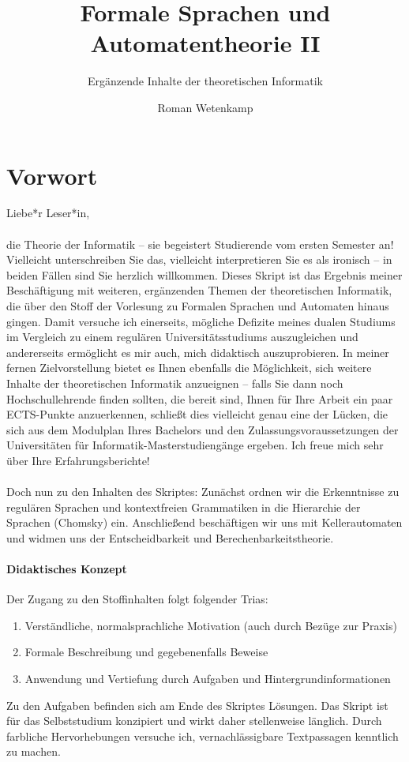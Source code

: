 \documentclass[11pt,a4paper]{scrreport}
\title{Formale Sprachen und Automatentheorie II}
\subtitle{Ergänzende Inhalte der theoretischen Informatik}
\author{Roman Wetenkamp}
\theoremstyle{remark}
\theoremstyle{definition}
\begin{document}
\maketitle

\pagebreak
\tableofcontents
\pagebreak
\section*{Vorwort}
Liebe*r Leser*in,\\\\
die Theorie der Informatik -- sie begeistert Studierende vom ersten Semester an! Vielleicht unterschreiben Sie das, vielleicht interpretieren Sie es als ironisch -- in beiden Fällen sind Sie herzlich willkommen. Dieses Skript ist das Ergebnis meiner Beschäftigung mit weiteren, ergänzenden Themen der theoretischen Informatik, die über den Stoff der Vorlesung zu Formalen Sprachen und Automaten hinaus gingen. Damit versuche ich einerseits, mögliche Defizite meines dualen Studiums im Vergleich zu einem regulären Universitätsstudiums auszugleichen und andererseits ermöglicht es mir auch, mich didaktisch auszuprobieren. In meiner fernen Zielvorstellung bietet es Ihnen ebenfalls die Möglichkeit, sich weitere Inhalte der theoretischen Informatik anzueignen -- falls Sie dann noch Hochschullehrende finden sollten, die bereit sind, Ihnen für Ihre Arbeit ein paar ECTS-Punkte anzuerkennen, schließt dies vielleicht genau eine der Lücken, die sich aus dem Modulplan Ihres Bachelors und den Zulassungsvoraussetzungen der Universitäten für Informatik-Masterstudiengänge ergeben. Ich freue mich sehr über Ihre Erfahrungsberichte! \\\\
Doch nun zu den Inhalten des Skriptes: Zunächst ordnen wir die Erkenntnisse zu regulären Sprachen und kontextfreien Grammatiken in die Hierarchie der Sprachen (Chomsky) ein. Anschließend beschäftigen wir uns mit Kellerautomaten und widmen uns der Entscheidbarkeit und Berechenbarkeitstheorie.
\paragraph{Didaktisches Konzept}
Der Zugang zu den Stoffinhalten folgt folgender Trias:
\begin{enumerate}
\item Verständliche, normalsprachliche Motivation (auch durch Bezüge zur Praxis)
\item Formale Beschreibung und gegebenenfalls Beweise
\item Anwendung und Vertiefung durch Aufgaben und Hintergrundinformationen
\end{enumerate}
Zu den Aufgaben befinden sich am Ende des Skriptes Lösungen. Das Skript ist für das Selbststudium konzipiert und wirkt daher stellenweise länglich. Durch farbliche Hervorhebungen versuche ich, vernachlässigbare Textpassagen kenntlich zu machen. 
\end{document}
